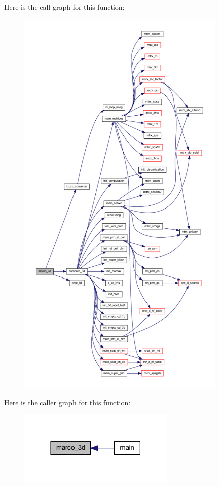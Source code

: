 Here is the call graph for this function\+:
\nopagebreak
\begin{figure}[H]
\begin{center}
\leavevmode
\includegraphics[height=550pt]{Marco_8f90_a68f6ead64a06017b55ddd63f010a306a_cgraph}
\end{center}
\end{figure}
Here is the caller graph for this function\+:
\nopagebreak
\begin{figure}[H]
\begin{center}
\leavevmode
\includegraphics[width=213pt]{Marco_8f90_a68f6ead64a06017b55ddd63f010a306a_icgraph}
\end{center}
\end{figure}
\mbox{\label{Marco_8f90_aa2f07b2e4c088385937e889ca561a4c4}} 
